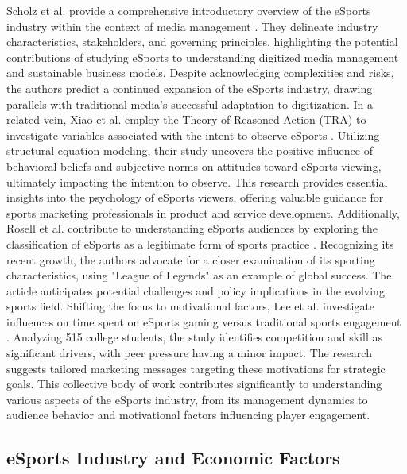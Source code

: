 \documentclass[manuscript,screen,review,anonymous]{acmart}
\begin{document}
Scholz et al. provide a comprehensive introductory overview of the eSports industry within the context of media management \cite{a22}. They delineate industry characteristics, stakeholders, and governing principles, highlighting the potential contributions of studying eSports to understanding digitized media management and sustainable business models. Despite acknowledging complexities and risks, the authors predict a continued expansion of the eSports industry, drawing parallels with traditional media's successful adaptation to digitization. In a related vein, Xiao et al. employ the Theory of Reasoned Action (TRA) to investigate variables associated with the intent to observe eSports \cite{a24}. Utilizing structural equation modeling, their study uncovers the positive influence of behavioral beliefs and subjective norms on attitudes toward eSports viewing, ultimately impacting the intention to observe. This research provides essential insights into the psychology of eSports viewers, offering valuable guidance for sports marketing professionals in product and service development. Additionally, Rosell et al. contribute to understanding eSports audiences by exploring the classification of eSports as a legitimate form of sports practice \cite{a20}. Recognizing its recent growth, the authors advocate for a closer examination of its sporting characteristics, using "League of Legends" as an example of global success. The article anticipates potential challenges and policy implications in the evolving sports field. Shifting the focus to motivational factors, Lee et al. investigate influences on time spent on eSports gaming versus traditional sports engagement \cite{a9}. Analyzing 515 college students, the study identifies competition and skill as significant drivers, with peer pressure having a minor impact. The research suggests tailored marketing messages targeting these motivations for strategic goals. This collective body of work contributes significantly to understanding various aspects of the eSports industry, from its management dynamics to audience behavior and motivational factors influencing player engagement.


\subsection{eSports Industry and Economic Factors}
\end{document}
